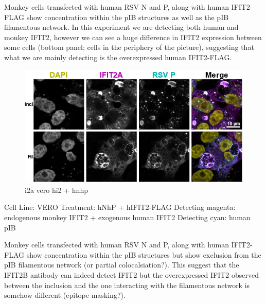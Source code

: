 Monkey cells transfected with human RSV N and P, along with human IFIT2-FLAG show concentration within the pIB structures as well as the pIB filamentous network. In this experiment we are detecting both human and monkey IFIT2, however we can see a huge difference in IFIT2 expression between some cells (bottom panel; cells in the periphery of the picture), suggesting that what we are mainly detecting is the overexpressed human IFIT2-FLAG.

\begin{figure}
    \centering
    \includegraphics[width=1\linewidth]{10. Chapter 5/Figs/03. IFIT2-FLAG/02. i2a vero hi2 hnhp.png}
    \caption[i2a vero hi2 + hnhp]{i2a vero hi2 + hnhp}
    \label{fig:i2a vero hi2 + hnhp}
\end{figure}

Cell Line: VERO \newline
Treatment: hNhP + hIFIT2-FLAG \newline
Detecting magenta: endogenous monkey IFIT2 + exogenous human IFIT2 \newline
Detecting cyan: human pIB \newline

Monkey cells transfected with human RSV N and P, along with human IFIT2-FLAG show concentration within the pIB structures but show exclusion from the pIB filamentous network (or partial colocalsiation?). This suggest that the IFIT2B antibody can indeed detect IFIT2 but the overexpressed IFIT2 observed between the inclusion and the one interacting with the filamentous network is somehow different (epitope masking?).

